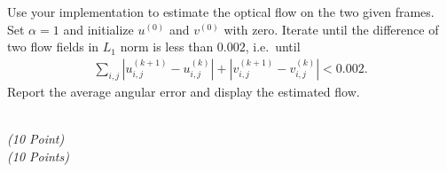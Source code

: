 \documentclass[11pt]{article}
\newcommand{\points}[1]{
    \ifthenelse{\equal{#1}{1}}
        {\\ \emph{(#1 Point)}}
        {\\ \emph{(#1 Points)}}
}
\begin{document}
\begin{enumerate}
    Use your implementation to estimate the optical flow on the two given frames. Set $ \alpha = 1 $ and initialize
    $ u^{(0)} $ and $ v^{(0)} $ with zero. Iterate until the difference of two flow fields in $ L_1 $ norm is less than
    $ 0.002 $, i.e.\ until
    \begin{align}
        \sum_{i,j} |u^{(k+1)}_{i,j} - u^{(k)}_{i,j}| + |v^{(k+1)}_{i,j} - v^{(k)}_{i,j}| < 0.002.
    \end{align}
    Report the average angular error and display the estimated flow.
    \points{10}
\end{enumerate}
\end{document}
